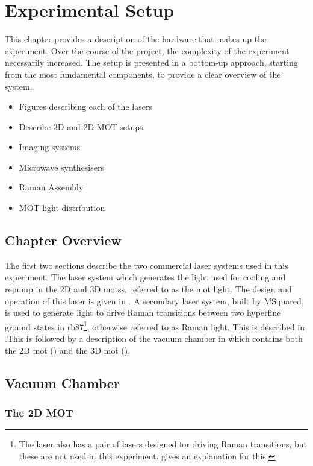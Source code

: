 \chapter{Experimental Setup}\label{chap:setup}
This chapter provides a description of the hardware that makes up the experiment. Over the course of the project, the complexity of the experiment necessarily increased. The setup is presented in a bottom-up approach, starting from the most fundamental components, to provide a clear overview of the system. \\

\begin{itemize}\item Figures describing each of the lasers
    \item Describe 3D and 2D MOT setups  
    \item Imaging systems
    \item Microwave synthesisers
    \item Raman Assembly
    \item MOT light distribution
\end{itemize}
\section{Chapter Overview}\label{sec:setup_overview}
The first two sections describe the two commercial laser systems used in this experiment. The \Muquans laser system which generates the light used for cooling and repump in the 2D and 3D \acp{mots}, referred to as the \acs{mot} light. The design and operation of this laser is given in . A secondary laser system, built by MSquared, is used to generate light to drive Raman transitions between two hyperfine ground states in \ac{rb87}\footnote{The \Muquans laser also has a pair of lasers designed for driving Raman transitions, but these are not used in this experiment.  gives an explanation for this.}, otherwise referred to as Raman light. This is described in .This is followed by a description of the vacuum chamber in  which contains both the 2D \ac{mot} () and the 3D \ac{mot} ().  
\section{Vacuum Chamber}\label{sec:setup_chamber}
\subsection{The 2D MOT}\label{subsec:setup_2DMOT}

